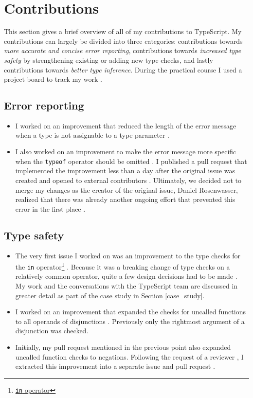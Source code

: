 \documentclass[12pt]{scrartcl}
\def\code#1{\texttt{\frenchspacing#1}}
\begin{document}
\section{Contributions}

This section gives a brief overview of all of my contributions to TypeScript. My contributions can largely be divided into three categories: contributions towards \textit{more accurate and concise error reporting}, contributions towards \textit{increased type safety} by strengthening existing or adding new type checks, and lastly contributions towards \textit{better type inference}. During the practical course I used a project board to track my work \cite{ProjectBoard}.

\subsection{Error reporting}

\begin{itemize}
    \item I worked on an improvement that reduced the length of the error message when a type is not assignable to a type parameter \cite{42849,42952}.
    \item I also worked on an improvement to make the error message more specific when the \code{typeof} operator should be omitted \cite{42523}. I published a pull request that implemented the improvement less than a day after the original issue was created and opened to external contributors \cite{42530}. Ultimately, we decided not to merge my changes as the creator of the original issue, Daniel Rosenwasser, realized that there was already another ongoing effort that prevented this error in the first place \cite{42530Comment}.
\end{itemize}

\subsection{Type safety}

\begin{itemize}
    \item The very first issue I worked on was an improvement to the type checks for the \code{in} operator\footnote{\href{https://developer.mozilla.org/en-US/docs/Web/JavaScript/Reference/Operators/in}{\code{in} operator}} \cite{41317}. Because it was a breaking change of type checks on a relatively common operator, quite a few design decisions had to be made \cite{41928}. My work and the conversations with the TypeScript team are discussed in greater detail as part of the case study in Section \ref{case_study}.
    \item I worked on an improvement that expanded the checks for uncalled functions to all operands of disjunctions \cite{35584,42835}. Previously only the rightmost argument of a disjunction was checked.
    \item Initially, my pull request mentioned in the previous point also expanded uncalled function checks to negations. Following the request of a reviewer \cite{42835Comment}, I extracted this improvement into a separate issue \cite{43096} and pull request \cite{43097}.
\end{itemize}
\end{document}
